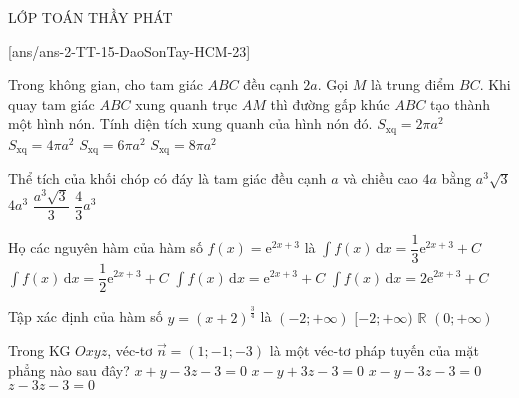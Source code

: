 \begin{name}
	{\tenchude}{\tendethi}{LỚP TOÁN THẦY PHÁT}{\thoigian}
\end{name}
\setcounter{ex}{0}\setcounter{bt}{0}
[ans/ans-2-TT-15-DaoSonTay-HCM-23]
\begin{ex}%
	Trong không gian, cho tam giác $ABC$ đều cạnh $2a$. Gọi $M$ là trung điểm $BC$. Khi quay tam giác $ABC$ xung quanh trục $AM$ thì đường gấp khúc $ABC$ tạo thành một hình nón. Tính diện tích xung quanh của hình nón đó.
	\choice
	{\True $S_{\text{xq}}=2\pi a^2$}
	{$S_{\text{xq}}=4\pi a^2$}
	{$S_{\text{xq}}=6\pi a^2$}
	{$S_{\text{xq}}=8\pi a^2$}
\end{ex}
\begin{ex}%
	Thể tích của khối chóp có đáy là tam giác đều cạnh $a$ và chiều cao $4a$ bằng
	\choice
	{$a^3\sqrt{3}$}
	{$4a^3$}
	{\True $\dfrac{a^3\sqrt{3}}{3}$}
	{$\dfrac{4}{3}a^3$}
\end{ex}
\begin{ex}%
	Họ các nguyên hàm của hàm số $f(x)=\mathrm{e}^{2x+3}$ là
	\choice
	{$\displaystyle\int f(x)\mathrm{\,d}x=\dfrac{1}{3}\mathrm{e}^{2x+3}+C$}
	{\True $\displaystyle\int f(x)\mathrm{\,d}x=\dfrac{1}{2}\mathrm{e}^{2x+3}+C$}
	{$\displaystyle\int f(x)\mathrm{\,d}x=\mathrm{e}^{2x+3}+C$}
	{$\displaystyle\int f(x)\mathrm{\,d}x=2\mathrm{e}^{2x+3}+C$}
\end{ex}
\begin{ex}%
	Tập xác định của hàm số $y=(x+2)^{\tfrac{3}{4}}$ là
	\choice
	{\True $(-2;+\infty)$}
	{$[-2;+\infty)$}
	{$\mathbb{R}$}
	{$(0;+\infty)$}
\end{ex}
\begin{ex}%
	Trong KG $Oxyz$, véc-tơ $\vec{n}=(1;-1;-3)$ là một véc-tơ pháp tuyến của mặt phẳng nào sau đây?
	\choice
	{$x+y-3z-3=0$}
	{$x-y+3z-3=0$}
	{\True $x-y-3z-3=0$}
	{$z-3z-3=0$}
\end{ex}
